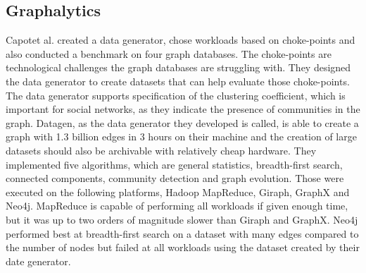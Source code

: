 \subsection{Graphalytics}
Capot\ua et al. created a data generator, chose workloads based on choke-points and also conducted a benchmark on four graph databases.
The choke-points are technological challenges the graph databases are struggling with.
They designed the data generator to create datasets that can help evaluate those choke-points.
The data generator supports specification of the clustering coefficient,
which is important for social networks,
as they indicate the presence of communities in the graph.
Datagen, as the data generator they developed is called,
is able to create a graph with 1.3 billion edges in 3 hours on their machine and the creation of large datasets should also be archivable with relatively cheap hardware.
They implemented five algorithms,
which are general statistics, breadth-first search, connected components, community detection and graph evolution.
Those were executed on the following platforms,
Hadoop MapReduce, Giraph, GraphX and Neo4j.
MapReduce is capable of performing all workloads if given enough time,
but it was up to two orders of magnitude slower than Giraph and GraphX.
Neo4j performed best at breadth-first search on a dataset with many edges compared to the number of nodes but failed at all workloads using the dataset created by their date generator.~\cite{Capota2015}

